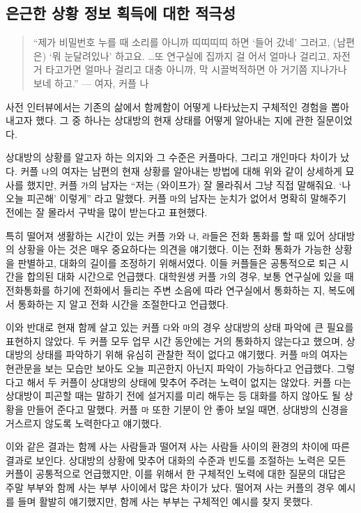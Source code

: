 \subsection{은근한 상황 정보 획득에 대한 적극성}

\begin{quote}
``제가 비밀번호 누를 때 소리를 아니까 띠띠띠띠 하면 `들어 갔네' 그러고, (남편은) `뭐 눈달려있나' 하고요. \ldots 또 연구실에 집까지 걸 어서 얼마나 걸리고, 자전거 타고가면 얼마나 걸리고 대충 아니까, 막 시끌벅적하면 아 거기쯤 지나가나 보네 하고.'' --- 여자, 커플 나
\end{quote}

사전 인터뷰에서는 기존의 삶에서 함께함이 어떻게 나타났는지 구체적인 경험을 뽑아내고자 했다. 그 중 하나는 상대방의 현재 상태를 어떻게 알아내는 지에 관한 질문이었다.

상대방의 상황를 알고자 하는 의지와 그 수준은 커플마다, 그리고 개인마다 차이가 났다. 커플 \texttt{나}의 여자는 남편의 현재 상황를 알아내는 방법에 대해 위와 같이 상세하게 묘사를 했지만, 커플 \texttt{가}의 남자는 ``저는 (와이프가) 잘 몰라줘서 그냥 직접 말해줘요. `나 오늘 피곤해' 이렇게'' 라고 말했다. 커플 \texttt{마}의 남자는 눈치가 없어서 명확히 말해주기 전에는 잘 몰라서 구박을 많이 받는다고 표현했다.

특히 떨어져 생활하는 시간이 있는 커플 \texttt{가}와 \texttt{나}, \texttt{라}들은 전화 통화를 할 때 있어 상대방의 상황을 아는 것은 매우 중요하다는 의견을 얘기했다. 이는 전화 통화가 가능한 상황을 판별하고, 대화의 길이를 조정하기 위해서였다. 이들 커플들은 공통적으로 퇴근 시간을 합의된 대화 시간으로 언급했다. 대학원생 커플 \texttt{가}의 경우, 보통 연구실에 있을 때 전화통화를 하기에 전화에서 들리는 주변 소음에 따라 연구실에서 통화하는 지, 복도에서 통화하는 지 알고 전화 시간을 조절한다고 언급했다.

이와 반대로 현재 함께 살고 있는 커플 \texttt{다}와 \texttt{마}의 경우 상대방의 상태 파악에 큰 필요를 표현하지 않았다. 두 커플 모두 업무 시간 동안에는 거의 통화하지 않는다고 했으며, 상대방의 상태를 파악하기 위해 유심히 관찰한 적이 없다고 얘기했다. 커플 \texttt{마}의 여자는 현관문을 보는 모습만 보아도 오늘 피곤한지 아닌지 파악이 가능하다고 언급했다. 그렇다고 해서 두 커플이 상대방의 상태에 맞추어 주려는 노력이 없지는 않았다. 커플 \texttt{다}는 상대방이 피곤할 때는 말하기 전에 설거지를 미리 해두는 등 대화를 하지 않아도 될 상황을 만들어 준다고 말했다. 커플 \texttt{마} 또한 기분이 안 좋아 보일 때면, 상대방의 신경을 거스르지 않도록 노력한다고 얘기했다.

이와 같은 결과는 함께 사는 사람들과 떨어져 사는 사람들 사이의 환경의 차이에 따른 결과로 보인다. 상대방의 상황에 맞추어 대화의 수준과 빈도를 조절하는 노력은 모든 커플이 공통적으로 언급했지만, 이를 위해서 한 구체적인 노력에 대한 질문의 대답은 주말 부부와 함께 사는 부부 사이에서 많은 차이가 났다. 떨어져 사는 커플의 경우 예시를 들며 활발히 얘기했지만, 함께 사는 부부는 구체적인 예시를 찾지 못했다.

